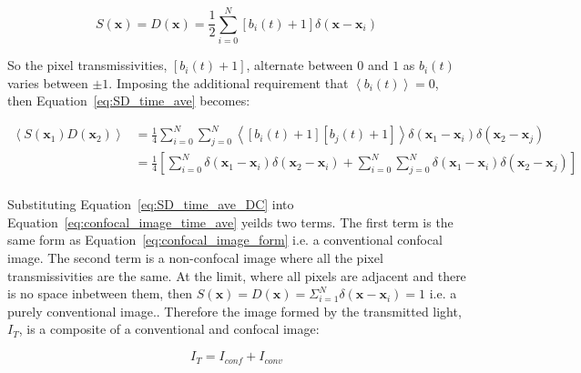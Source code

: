 \begin{equation}\label{eq:detector_aperture_time_DC}
	S\left(\textbf{x}\right) = D\left(\textbf{x}\right) = \frac{1}{2} \sum_{i=0}^{N} \left[b_{i}\left(t\right) + 1\right]\delta\left(\textbf{x} - \textbf{x}_{i}\right)
\end{equation} 

So the pixel transmissivities, $\left[b_{i}\left(t\right) + 
1\right]$, alternate between $0$ and $1$ as $b_{i}\left(t\right)$ 
varies between $\pm1$. Imposing the additional requirement that 
$\left\langle b_{i}\left(t\right) \right\rangle = 0$, then 
Equation~\ref{eq:SD_time_ave} becomes:

\begin{equation}\label{eq:SD_time_ave_DC}
	\begin{split}
		\left\langle S\left(\textbf{x}_{1}\right) D\left(\textbf{x}_{2}\right)\right\rangle &= \frac{1}{4} \sum_{i=0}^{N}\sum_{j=0}^{N} \left\langle \left[b_{i}\left(t\right) + 1\right] \left[b_{j}\left(t\right) + 1\right] \right\rangle \delta\left(\textbf{x}_{1} - \textbf{x}_{i}\right) \delta\left(\textbf{x}_{2} - \textbf{x}_{j}\right)\\
		&= \frac{1}{4} \left[\sum_{i=0}^{N} \delta\left(\textbf{x}_{1} - \textbf{x}_{i}\right) \delta\left(\textbf{x}_{2} - \textbf{x}_{i}\right) + \sum_{i=0}^{N}\sum_{j=0}^{N} \delta\left(\textbf{x}_{1} - \textbf{x}_{i}\right) \delta\left(\textbf{x}_{2} - \textbf{x}_{j}\right)\right]\\
	\end{split}
\end{equation}

Substituting Equation~\ref{eq:SD_time_ave_DC} into Equation~\ref{eq:confocal_image_time_ave} 
yeilds two terms. The first term is the same form as 
Equation~\ref{eq:confocal_image_form} i.e. a conventional 
confocal image. The second term is a non-confocal image 
where all the pixel transmissivities are the same. At the 
limit, where all pixels are adjacent and there is no space 
inbetween them, then $S\left(\textbf{x}\right) = 
D\left(\textbf{x}\right) = \Sigma_{i=1}^{N}\delta\left(
\textbf{x} - \textbf{x}_{i}\right) = 1$ i.e. a purely 
conventional image.\cite{juskaitis1996efficient,wilson1996confocal}. 
Therefore the image formed by the transmitted light, $I_{T}$, 
is a composite of a conventional and confocal image:

\begin{equation}\label{eq:transmitted_image}
	I_{T} = I_{conf} + I_{conv}
\end{equation}

